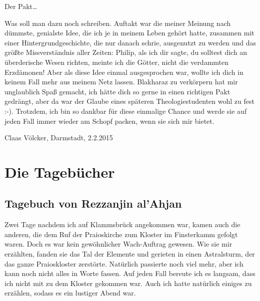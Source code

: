 Der Pakt\dots

Was soll man dazu noch schreiben. Auftakt war die meiner Meinung nach dümmste, genialste Idee, die ich je in meinem Leben gehört hatte, zusammen mit einer Hintergrundgeschichte, die nur danach schrie, ausgenutzt zu werden und das größte Missverständnis aller Zeiten: Philip, als ich dir sagte, du solltest dich an überderische Wesen richten, meinte ich die Götter, nicht die verdammten Erzdämonen! Aber als diese Idee einmal ausgesprochen war, wollte ich dich in keinem Fall mehr aus meinem Netz lassen. Blakharaz zu verkörpern hat mir unglaublich Spaß gemacht, ich hätte dich so gerne in einen richtigen Pakt gedrängt, aber da war der Glaube eines späteren Theologiestudenten wohl zu fest :-). Trotzdem, ich bin so dankbar für diese einmalige Chance und werde sie auf jeden Fall immer wieder am Schopf packen, wenn sie sich mir bietet.

\begin{flushright}
Claas Völcker, Darmstadt, 2.2.2015
\end{flushright}



 
 
\section{Die Tagebücher}


\subsection{Tagebuch von Rezzanjin al'Ahjan}

Zwei Tage nachdem ich auf Klammsbrück angekommen war, kamen auch die anderen, die dem Ruf der Praioskirche zum Kloster im Finsterkamm gefolgt waren. Doch es war kein gewöhnlicher Wach-Auftrag gewesen. Wie sie mir erzählten, fanden sie das Tal der Elemente und gerieten in einen Astralsturm, der das ganze Praioskloster zerstörte. Natürlich passierte noch viel mehr, aber ich kann noch nicht alles in Worte fassen. Auf jeden Fall bereute ich es langsam, dass ich nicht mit zu dem Kloster gekommen war. Auch ich hatte natürlich einiges zu erzählen, sodass es ein lustiger Abend war.


